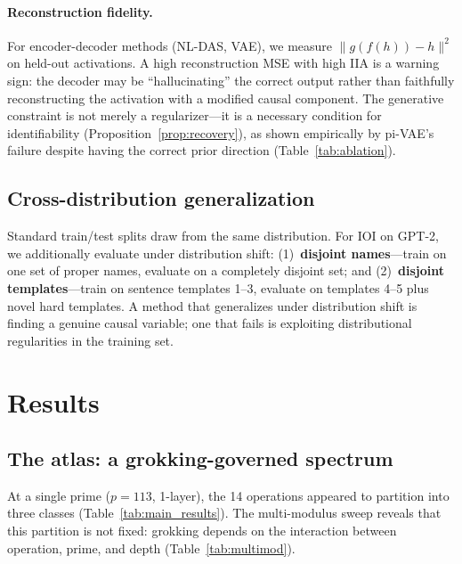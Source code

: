 \documentclass{article}
\begin{document}
\paragraph{Reconstruction fidelity.}
For encoder-decoder methods (NL-DAS, VAE), we measure $\|g(f(h)) - h\|^2$ on
held-out activations. A high reconstruction MSE with high IIA is a warning sign:
the decoder may be ``hallucinating'' the correct output rather than faithfully
reconstructing the activation with a modified causal component.
The generative constraint is not merely a regularizer---it is a necessary
condition for identifiability (Proposition~\ref{prop:recovery}), as shown
empirically by pi-VAE's failure despite having the correct prior direction
(Table~\ref{tab:ablation}).

\subsection{Cross-distribution generalization}
\label{sec:cross_distribution}

Standard train/test splits draw from the same distribution. For IOI on GPT-2, we
additionally evaluate under distribution shift: (1)~\textbf{disjoint names}---train
on one set of proper names, evaluate on a completely disjoint set; and
(2)~\textbf{disjoint templates}---train on sentence templates 1--3, evaluate on
templates 4--5 plus novel hard templates. A method that generalizes under
distribution shift is finding a genuine causal variable; one that fails is
exploiting distributional regularities in the training set.


\section{Results}
\label{sec:results}

\subsection{The atlas: a grokking-governed spectrum}

At a single prime ($p{=}113$, 1-layer), the 14 operations appeared to partition
into three classes (Table~\ref{tab:main_results}). The multi-modulus sweep
reveals that this partition is not fixed: grokking depends on the interaction
between operation, prime, and depth (Table~\ref{tab:multimod}).
\end{document}
